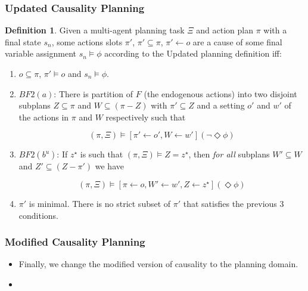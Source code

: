 \documentclass{beamer}
\theoremstyle{plain}
\theoremstyle{definition}
\newtheorem{defn}[thm]{Definition} %
\begin{document}
\begin{frame}
\frametitle{Updated Causality Planning}
\small
\begin{defn}
Given a multi-agent planning task $\Xi$ and action plan $\pi$ with a final state $s_n$, some actions slots $\pi'$, $\pi' \subseteq \pi$, $\pi' \leftarrow o$ are a cause of some final variable assignment $s_n \models \phi$ according to the Updated planning definition iff:
\begin{enumerate}
\item  $o \subseteq \pi$, $\pi' \models o$ and $s_n \models \phi$.



\item $BF2(a)$: There is partition of $F$ (the endogenous actions) into two disjoint subplans $Z \subseteq \pi$ and $W \subseteq (\pi - Z)$ with $\pi' \subseteq Z$ and a setting $o'$ and $w'$ of the actions in $\pi$ and $W$ respectively such that

\[
(\pi, \Xi) \models [\pi' \leftarrow o', W \leftarrow w'](\lnot \Diamond \phi)
\]

\item $BF2(b^u)$: If $z^\star$ is such that $(\pi, \Xi) \models Z = z^\star$, then \textit{for all} subplans $W' \subseteq W$ and $Z' \subseteq (Z - \pi')$ we have

\[
(\pi, \Xi) \models [\pi \leftarrow o, W' \leftarrow w', Z \leftarrow z^\star](\Diamond \phi)
\]

\item $\pi'$ is minimal. There is no strict subset of $\pi'$ that satisfies the previous 3 conditions.
\end{enumerate}
\end{defn}

\end{frame}



\begin{frame}
\frametitle{Modified Causality Planning}
\begin{itemize}
\item Finally, we change the modified version of causality to the planning domain.
\item 
\end{itemize}

\end{frame}
\end{document}
